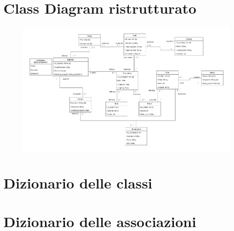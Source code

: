     \section{Class Diagram ristrutturato}
    \begin{figure}[htbp]
    \begin{center}
        \includegraphics[width=12.1cm]{Immagini/CD Ristrutturato final.jpg}
    \end{center}
    \end{figure}
    
        
    \section{Dizionario delle classi}
        
    \section{Dizionario delle associazioni}